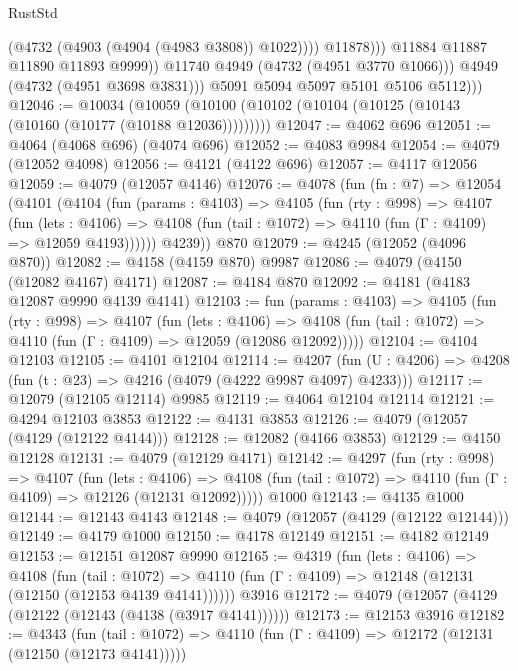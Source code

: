 \begin{lexlean}{RustStd}
\begin{coremodule}
{\begin{coremodule}
{{{{{{{{{{{{{{                            (@4732 (@4903 (@4904 (@4983 @3808)) @1022))))
                        @11878)))
                  @11884
                  @11887
                  @11890
                  @11893
                  @9999))
              @11740
              @4949
              (@4732 (@4951 @3770 @1066)))
            @4949
            (@4732 (@4951 @3698 @3831)))
          @5091
          @5094
          @5097
          @5101
          @5106
          @5112)))
@12046 := @10034
    (@10059 (@10100 (@10102 (@10104 (@10125 (@10143 (@10160 (@10177 (@10188 @12036)))))))))
@12047 := @4062 @696
@12051 := @4064 (@4068 @696) (@4074 @696)
@12052 := @4083 @9984
@12054 := @4079 (@12052 @4098)
@12056 := @4121 (@4122 @696)
@12057 := @4117 @12056
@12059 := @4079 (@12057 @4146)
@12076 := @4078
    (fun (fn : @7) =>
    @12054
      (@4101
        (@4104
          (fun (params : @4103) =>
          @4105
            (fun (rty : @998) =>
            @4107
              (fun (lets : @4106) =>
              @4108 (fun (tail : @1072) => @4110 (fun (Γ : @4109) => @12059 @4193))))))
        @4239))
    @870
@12079 := @4245 (@12052 (@4096 @870))
@12082 := @4158 (@4159 @870) @9987
@12086 := @4079 (@4150 (@12082 @4167) @4171)
@12087 := @4184 @870
@12092 := @4181 (@4183 @12087 @9990 @4139 @4141)
@12103 := fun (params : @4103) =>
  @4105
    (fun (rty : @998) =>
    @4107
      (fun (lets : @4106) =>
      @4108 (fun (tail : @1072) => @4110 (fun (Γ : @4109) => @12059 (@12086 @12092)))))
@12104 := @4104 @12103
@12105 := @4101 @12104
@12114 := @4207
    (fun (U : @4206) => @4208 (fun (t : @23) => @4216 (@4079 (@4222 @9987 @4097) @4233)))
@12117 := @12079 (@12105 @12114) @9985
@12119 := @4064 @12104 @12114
@12121 := @4294 @12103 @3853
@12122 := @4131 @3853
@12126 := @4079 (@12057 (@4129 (@12122 @4144)))
@12128 := @12082 (@4166 @3853)
@12129 := @4150 @12128
@12131 := @4079 (@12129 @4171)
@12142 := @4297
    (fun (rty : @998) =>
    @4107
      (fun (lets : @4106) =>
      @4108 (fun (tail : @1072) => @4110 (fun (Γ : @4109) => @12126 (@12131 @12092)))))
    @1000
@12143 := @4135 @1000
@12144 := @12143 @4143
@12148 := @4079 (@12057 (@4129 (@12122 @12144)))
@12149 := @4179 @1000
@12150 := @4178 @12149
@12151 := @4182 @12149
@12153 := @12151 @12087 @9990
@12165 := @4319
    (fun (lets : @4106) =>
    @4108
      (fun (tail : @1072) =>
      @4110 (fun (Γ : @4109) => @12148 (@12131 (@12150 (@12153 @4139 @4141))))))
    @3916
@12172 := @4079 (@12057 (@4129 (@12122 (@12143 (@4138 (@3917 @4141))))))
@12173 := @12153 @3916
@12182 := @4343
    (fun (tail : @1072) => @4110 (fun (Γ : @4109) => @12172 (@12131 (@12150 (@12173 @4141)))))
}}}}}}}}}}}}}}
\end{coremodule}}
\end{coremodule}
\end{lexlean}
